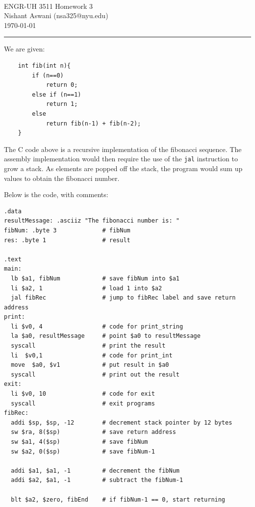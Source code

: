 \documentclass[11pt]{exam}
\makeatletter
\newcommand{\myname}{Nishant Aswani}
\newcommand{\myemail}{nsa325@nyu.edu}
\newcommand{\myhwtype}{Homework}
\newcommand{\myhwnum}{3}
\newcommand{\mycoursenumber}{ENGR-UH 3511}
\newcommand{\cc}[1]{\texttt{#1}}
\newcounter{questionCounter}
\newcounter{partCounter}[questionCounter]
\newenvironment{namedquestion}[1]{%
    \addtocounter{questionCounter}{1}%
    \setcounter{partCounter}{0}%
    \vspace{.2in}%
        \noindent{\bf #1}%
    \vspace{0.3em} \hrule \vspace{.1in}%
}{}
\makeatother
\begin{document}
\

{\newpage}


\thispagestyle{plain}
\begin{center}
  {\Large \mycoursenumber{} \myhwtype{} \myhwnum} \\
  \myname{} (\myemail{}) \\
  \today
\end{center}

\setcounter{questionCounter}{0}

\begin{namedquestion}{Question 2.31}

We are given:
\begin{lstlisting}
    int fib(int n){
        if (n==0)
            return 0;
        else if (n==1)
            return 1;
        else 
            return fib(n-1) + fib(n-2);
    }
\end{lstlisting}

The C code above is a recursive implementation of the fibonacci sequence. The assembly implementation would then require the use of the \cc{jal} instruction to grow a stack. As elements are popped off the stack, the program would sum up values to obtain the fibonacci number. 

Below is the code, with comments: 

\begin{verbatim}
.data
resultMessage: .asciiz "The fibonacci number is: "
fibNum: .byte 3             # fibNum
res: .byte 1                # result

.text
main:
  lb $a1, fibNum            # save fibNum into $a1
  li $a2, 1                 # load 1 into $a2
  jal fibRec                # jump to fibRec label and save return address
print:
  li $v0, 4                 # code for print_string
  la $a0, resultMessage     # point $a0 to resultMessage
  syscall                   # print the result
  li  $v0,1                 # code for print_int
  move  $a0, $v1            # put result in $a0
  syscall                   # print out the result
exit:
  li $v0, 10                # code for exit
  syscall                   # exit programs
fibRec:
  addi $sp, $sp, -12        # decrement stack pointer by 12 bytes
  sw $ra, 8($sp)            # save return address 
  sw $a1, 4($sp)            # save fibNum
  sw $a2, 0($sp)            # save fibNum-1
  
  addi $a1, $a1, -1         # decrement the fibNum
  addi $a2, $a1, -1         # subtract the fibNum-1
  
  blt $a2, $zero, fibEnd    # if fibNum-1 == 0, start returning
  

\end{verbatim}
\end{namedquestion}
\end{document}
